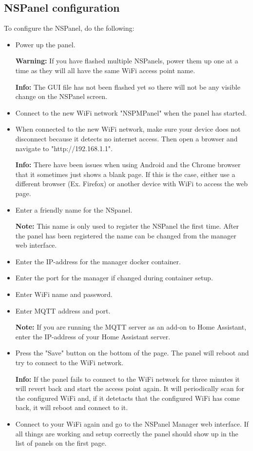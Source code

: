 \documentclass[10pt]{article}
\newcommand{\info}[1]{\begin{infoBox} \textbf{Info:} #1 \end{infoBox}}
\newcommand{\note}[1]{\begin{noteBox} \textbf{Note:} #1 \end{noteBox}}
\newcommand{\warning}[1]{\begin{hintBox} \textbf{Warning:} #1 \end{hintBox}}
\begin{document}
    \subsection{NSPanel configuration}
    \label{sec:nspanel_configuration}
    To configure the NSPanel, do the following:
    \begin{itemize}
      \item Power up the panel.
      \warning{If you have flashed multiple NSPanels, power them up one at a time as they will all have the same WiFi access point name.}
      \info{The GUI file has not been flashed yet so there will not be any visible change on the NSPanel screen.}
      \item Connect to the new WiFi network "NSPMPanel" when the panel has started.
      \item When connected to the new WiFi network, make sure your device does not disconnect because it detects no internet access. Then open a browser and navigate to "http://192.168.1.1".
      \info{There have been issues when using Android and the Chrome browser that it sometimes just shows a blank page. If this is the case, either use a different browser (Ex. Firefox) or another device with WiFi to access the web page.}
      \item Enter a friendly name for the NSpanel.
      \note{This name is only used to register the NSPanel the first time. After the panel has been registered the name can be changed from the manager web interface.}
      \item Enter the IP-address for the manager docker container.
      \item Enter the port for the manager if changed during container setup.
      \item Enter WiFi name and password.
      \item Enter MQTT address and port.
      \note{If you are running the MQTT server as an add-on to Home Assistant, enter the IP-address of your Home Assistant server.}
      \item Press the "Save" button on the bottom of the page. The panel will reboot and try to connect to the WiFi network.
      \info{If the panel fails to connect to the WiFi network for three minutes it will revert back and start the access point again. It will periodically scan for the configured WiFi and, if it detetacts that the configured WiFi has come back, it will reboot and connect to it.}
      \item Connect to your WiFi again and go to the NSPanel Manager web interface. If all things are working and setup correctly the panel should show up in the list of panels on the first page.

\end{itemize}
\end{document}
